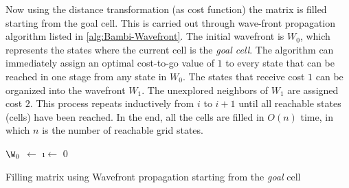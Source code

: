 Now using the distance transformation (as cost function) the matrix is filled starting from the goal cell. This is carried out through wave-front propagation algorithm listed in \autoref{alg:Bambi-Wavefront}.
The initial wavefront is $ W_0$, which represents the states where the current cell is the \textit{goal cell}. The algorithm can immediately assign an  optimal cost-to-go value of $ 1$ to every state that can be reached in one stage from any state in $ W_0$. The states that receive cost $ 1$ can be organized into the  wavefront $ W_1$. The unexplored neighbors of $ W_1$ are assigned cost $2$. This  process repeats inductively from $i$ to $ i+1$ until all reachable states (cells) have been reached. In the end, all the cells are filled in $O(n)$ time, in which $ n$ is the number of reachable grid states.
\begin{algorithm}
	
	\BlankLine
	
  	$\W_0$ $\leftarrow$ \GCell \;
	\i $\leftarrow$ 0 \;
\caption{Filling matrix using Wavefront propagation starting from the \textit{goal} cell}
\label{alg:Bambi-Wavefront}
\end{algorithm}

